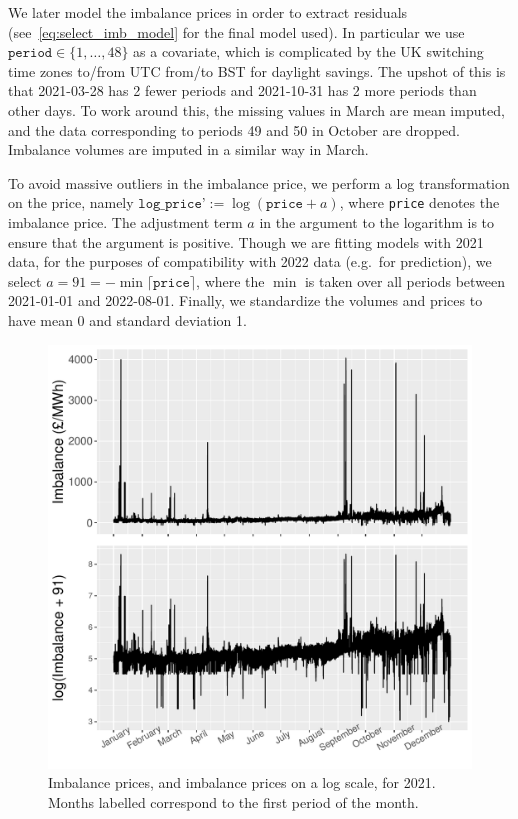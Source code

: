 \documentclass[11pt,twoside,openany]{book}
\newcommand{\code}[1]{\texttt{#1}}
\numberwithin{Theorem}{chapter}
\numberwithin{Definition}{chapter}
\numberwithin{Lemma}{chapter}
\numberwithin{Algorithm}{chapter}
\numberwithin{equation}{chapter}
\begin{document}
We later model the imbalance prices in order to extract residuals (see~\eqref{eq:select_imb_model} for the final model used). In particular we
use $\code{period}\in\{1,\ldots,48\}$ as a covariate, which is complicated by
the UK switching time zones to/from UTC from/to BST for daylight savings. The
upshot of this is that 2021-03-28 has 2 fewer periods and 2021-10-31 has 2 more
periods than other days. To work around this, the missing values in March are
mean imputed, and the data corresponding to periods 49 and 50 in October are
dropped. Imbalance volumes are imputed in a similar way in March.


To avoid massive outliers in the imbalance price, we perform a log transformation on the
price, namely $\code{log_price'}:= \log(\code{price} + a)$, where \code{price} denotes the imbalance price.
The adjustment term $a$ in the argument to the logarithm is to ensure that the argument is positive.
Though we are fitting models with 2021 data, for the purposes of compatibility with
2022 data (e.g.\ for prediction), we select $a=91=-\min\lceil\code{price}\rceil$,
where the $\min$ is taken over all periods between 2021-01-01 and 2022-08-01.
 Finally, we standardize the volumes and prices
to have mean 0 and standard deviation 1.

\FloatBarrier
\begin{figure}[htp]
  \centering
  \includegraphics[scale=0.75]{../elexon/figures/imbalance_whole_year.pdf}
  \caption{Imbalance prices, and imbalance prices on a log scale, for
  2021. Months labelled correspond to the first period of the month.}\label{fig:whole_year_imbalance_price}
\end{figure}
\end{document}
